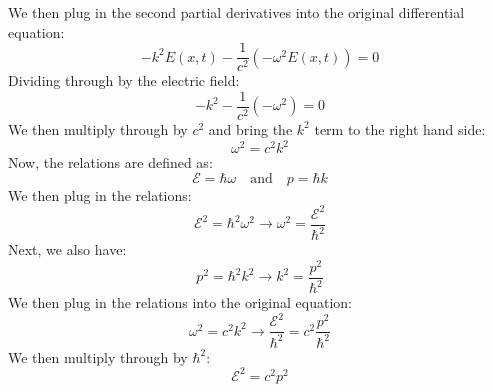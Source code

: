 \documentclass{article}
\begin{document}
We then plug in the second partial derivatives into the original differential equation:
\begin{equation}
    -k^2 E(x, t) - \frac{1}{c^2} (-\omega^2 E(x, t)) = 0
\end{equation}
Dividing through by the electric field:
\begin{equation}
    -k^2 - \frac{1}{c^2} (-\omega^2) = 0
\end{equation}
We then multiply through by $c^2$ and bring the $k^2$ term to the right hand side:
\begin{equation}
    \omega^2 = c^2 k^2
\end{equation}
Now, the relations are defined as:
\begin{equation}
    \mathcal{E} = \hbar\omega \quad \text{and} \quad p = \hbar k
\end{equation}
We then plug in the relations:
\begin{equation}
    \mathcal{E}^2 = \hbar^2 \omega^2 \rightarrow \omega^2 = \frac{\mathcal{E}^2}{\hbar^2}
\end{equation}
Next, we also have:
\begin{equation}
    p^2 = \hbar^2 k^2 \rightarrow k^2 = \frac{p^2}{\hbar^2}
\end{equation}
We then plug in the relations into the original equation:
\begin{equation}
    \omega^2 = c^2 k^2 \rightarrow \frac{\mathcal{E}^2}{\hbar^2} = c^2 \frac{p^2}{\hbar^2}
\end{equation}
We then multiply through by $\hbar^2$:
\begin{equation}
    \mathcal{E}^2 = c^2 p^2
\end{equation}
\end{document}
